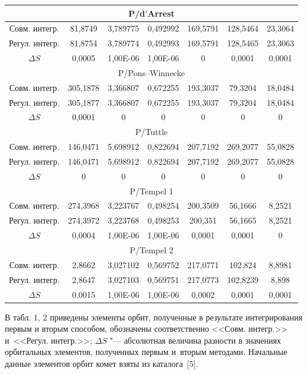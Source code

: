 \begin{table}[p!]
\begin{minipage}[t]{128mm}
\begin{tabular}{c|c|c|c|c|c|c}
\multicolumn{7}{c}{P/d$'$Arrest	}	\\	\hline
Совм. интегр.	&	81,8749	&	3,789775	&	0,492992	&	169,5791	&	128,5464	&	23,3064	\\
Регул. интегр.	&	81,8754	&	3,789774	&	0,492993	&	169,5791	&	128,5465	&	23,3063	\\
$\Delta S$	&	0,0005	&	1,00E-06	&	1,00E-06	&	0	&	0,0001	&	0,0001	\\	\hline
\multicolumn{7}{c}{P/Pons--Winnecke	}	\\	\hline
Совм. интегр.	&	305,1878	&	3,366807	&	0,672255	&	193,3037	&	79,3204	&	18,0484	\\
Регул. интегр.	&	305,1877	&	3,366807	&	0,672255	&	193,3037	&	79,3204	&	18,0484	\\
$\Delta S$	&	0,0001	&	0	&	0	&	0	&	0	&	0	\\	\hline
\multicolumn{7}{c}{P/Tuttle	}	\\	\hline
Совм. интегр.	&	146,0471	&	5,698912	&	0,822694	&	207,7192	&	269,2077	&	55,0828	\\
Регул. интегр.	&	146,0471	&	5,698912	&	0,822694	&	207,7192	&	269,2077	&	55,0828	\\
$\Delta S$	&	0	&	0	&	0	&	0	&	0	&	0	\\	\hline
\multicolumn{7}{c}{P/Tempel 1	}	\\	\hline
Совм. интегр.	&	274,3968	&	3,223767	&	0,498254	&	200,3509	&	56,1666	&	8,2521	\\
Регул. интегр.	&	274,3972	&	3,223768	&	0,498253	&	200,351	&	56,1665	&	8,2521	\\
$\Delta S$	&	0,0004	&	1,00E-06	&	1,00E-06	&	0,0001	&	0,0001	&	0	\\	\hline
\multicolumn{7}{c}{P/Tempel 2	}	\\	\hline
Совм. интегр.	&	2,8662	&	3,027102	&	0,569752	&	217,0771	&	102,824	&	8,8981	\\
Регул. интегр.	&	2,8647	&	3,027103	&	0,569751	&	217,0773	&	102,8239	&	8,898	\\
$\Delta S$	&	0,0015	&	1,00E-06	&	1,00E-06	&	0,0002	&	0,0001	&	0,0001	\\	\hline
\end{tabular}
\label{table:zausaev:tabl2}
\end{minipage}
\end{table}


В табл. 1, 2 приведены  элементы орбит, полученные в результате интегрирования первым и вторым способом, обозначены соответственно <<Совм. интегр.>> и~<<Регул. интегр.>>; $\Delta S$ "---  абсолютная величина разности в значениях орбитальных элементов, полученных первым и~вторым методами.
Начальные данные элементов орбит комет взяты из каталога~[5].

